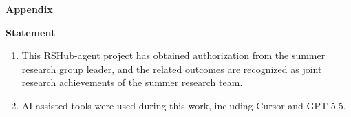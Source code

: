 \centerline{\xiaoyi\bf Appendix}

\vspace{2em}
\noindent
{}
{\fontsize{12pt}{14pt}\selectfont
	\textbf{Statement}
	
	\begin{enumerate}
		\item This RSHub-agent project has obtained authorization from the summer research group leader, and the related outcomes are recognized as joint research achievements of the summer research team.
		\item AI-assisted tools were used during this work, including Cursor and GPT-5.5.
	\end{enumerate}
}
